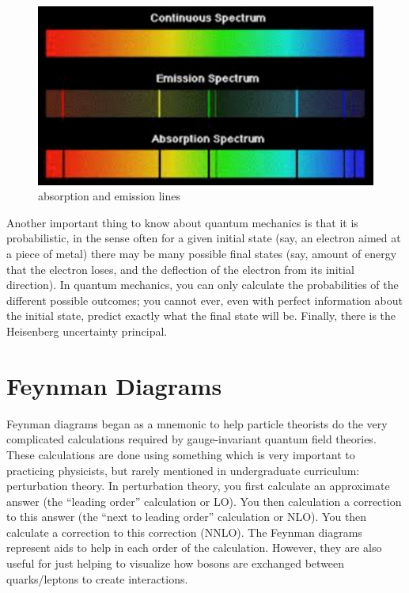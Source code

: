 \begin{figure}[h]
\centering\includegraphics[scale=0.5]{./ElementaryParticles/Pictures/fig6.pdf}
\caption{absorption and emission lines}
\label{fig:light}
\end{figure}


Another important thing to know about quantum mechanics is that it is probabilistic, in the sense often for a given initial state (say, an electron aimed at a piece of metal) there may be many possible final states (say, amount of energy that the electron loses, and the deflection of the electron from its initial direction).  In quantum mechanics, you can only calculate the probabilities of the different possible outcomes; you cannot ever, even with perfect information about the initial state, predict exactly what the final state will be.
Finally, there is the Heisenberg uncertainty principal.  



\section{Feynman Diagrams}

Feynman diagrams began as a mnemonic to help particle theorists do the very complicated calculations required by gauge-invariant quantum field theories.  These calculations are done using something which is very important to practicing physicists, but rarely mentioned in undergraduate curriculum: perturbation theory.  In perturbation theory, you first calculate an approximate answer (the “leading order” calculation or LO).  You then calculation a correction to this answer (the “next to leading order” calculation or NLO).  You then calculate a correction to this correction (NNLO).  The Feynman diagrams represent aids to help in each order of the calculation.  However, they are also useful for just helping to visualize how bosons are exchanged between quarks/leptons to create interactions.

